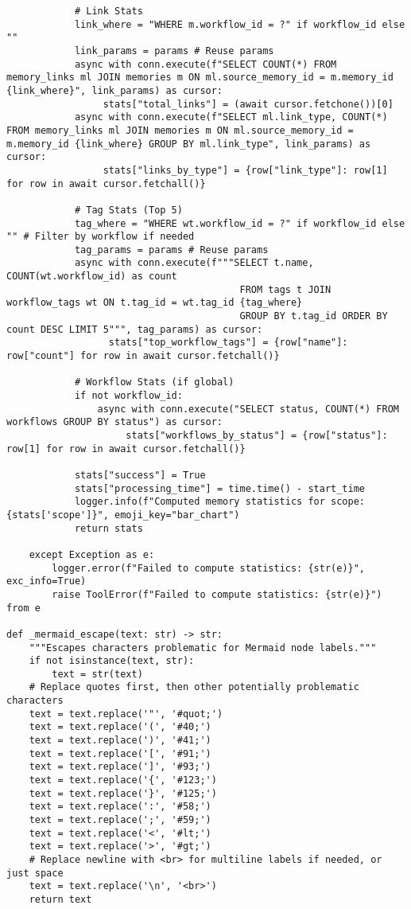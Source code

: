 \documentclass[12pt,a4paper]{article}
\begin{document}
\begin{pageablecode}
\begin{verbatim}
            # Link Stats
            link_where = "WHERE m.workflow_id = ?" if workflow_id else ""
            link_params = params # Reuse params
            async with conn.execute(f"SELECT COUNT(*) FROM memory_links ml JOIN memories m ON ml.source_memory_id = m.memory_id {link_where}", link_params) as cursor:
                 stats["total_links"] = (await cursor.fetchone())[0]
            async with conn.execute(f"SELECT ml.link_type, COUNT(*) FROM memory_links ml JOIN memories m ON ml.source_memory_id = m.memory_id {link_where} GROUP BY ml.link_type", link_params) as cursor:
                 stats["links_by_type"] = {row["link_type"]: row[1] for row in await cursor.fetchall()}

            # Tag Stats (Top 5)
            tag_where = "WHERE wt.workflow_id = ?" if workflow_id else "" # Filter by workflow if needed
            tag_params = params # Reuse params
            async with conn.execute(f"""SELECT t.name, COUNT(wt.workflow_id) as count
                                         FROM tags t JOIN workflow_tags wt ON t.tag_id = wt.tag_id {tag_where}
                                         GROUP BY t.tag_id ORDER BY count DESC LIMIT 5""", tag_params) as cursor:
                  stats["top_workflow_tags"] = {row["name"]: row["count"] for row in await cursor.fetchall()}

            # Workflow Stats (if global)
            if not workflow_id:
                async with conn.execute("SELECT status, COUNT(*) FROM workflows GROUP BY status") as cursor:
                     stats["workflows_by_status"] = {row["status"]: row[1] for row in await cursor.fetchall()}

            stats["success"] = True
            stats["processing_time"] = time.time() - start_time
            logger.info(f"Computed memory statistics for scope: {stats['scope']}", emoji_key="bar_chart")
            return stats

    except Exception as e:
        logger.error(f"Failed to compute statistics: {str(e)}", exc_info=True)
        raise ToolError(f"Failed to compute statistics: {str(e)}") from e

def _mermaid_escape(text: str) -> str:
    """Escapes characters problematic for Mermaid node labels."""
    if not isinstance(text, str):
        text = str(text)
    # Replace quotes first, then other potentially problematic characters
    text = text.replace('"', '#quot;')
    text = text.replace('(', '#40;')
    text = text.replace(')', '#41;')
    text = text.replace('[', '#91;')
    text = text.replace(']', '#93;')
    text = text.replace('{', '#123;')
    text = text.replace('}', '#125;')
    text = text.replace(':', '#58;')
    text = text.replace(';', '#59;')
    text = text.replace('<', '#lt;')
    text = text.replace('>', '#gt;')
    # Replace newline with <br> for multiline labels if needed, or just space
    text = text.replace('\n', '<br>')
    return text


\end{verbatim}
\end{pageablecode}
\end{document}
